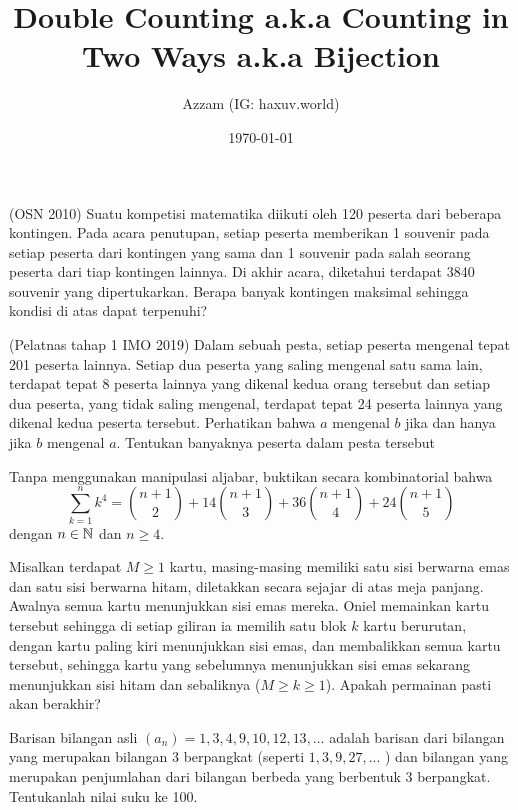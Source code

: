 \documentclass[11pt]{scrartcl}
\title{Double Counting a.k.a Counting in Two Ways a.k.a Bijection}
\author{Azzam (IG: haxuv.world)}
\date{\today}
\begin{document}
\maketitle

\begin{soaljawab}
    (OSN 2010) Suatu kompetisi matematika diikuti oleh 120 peserta dari beberapa kontingen. Pada acara penutupan, setiap peserta memberikan 1 souvenir pada setiap peserta dari kontingen yang sama dan 1 souvenir pada salah seorang peserta dari tiap kontingen lainnya. Di akhir acara, diketahui terdapat 3840 souvenir yang dipertukarkan. Berapa banyak kontingen maksimal sehingga kondisi di atas dapat terpenuhi?
\end{soaljawab}

\begin{soaljawab}
    (Pelatnas tahap 1 IMO 2019) Dalam sebuah pesta, setiap peserta mengenal tepat 201 peserta lainnya. Setiap dua peserta yang saling mengenal satu sama lain, terdapat tepat 8 peserta lainnya yang dikenal kedua orang tersebut dan setiap dua peserta, yang tidak saling mengenal, terdapat tepat 24 peserta lainnya yang dikenal kedua peserta tersebut. Perhatikan bahwa $a$ mengenal $b$ jika dan hanya jika $b$ mengenal $a$. Tentukan banyaknya peserta dalam pesta tersebut
\end{soaljawab}

\begin{soaljawab}
    Tanpa menggunakan manipulasi aljabar, buktikan secara kombinatorial bahwa
    $$\sum_{k=1}^{n} k^4 = {n+1 \choose 2} + 14{n+1 \choose 3}+36{n+1 \choose 4}+24{n+1 \choose 5}$$ dengan $n\in \mathbb N$ dan $n \ge 4$.
\end{soaljawab}

\begin{soaljawab}
Misalkan terdapat $M \ge 1$ kartu, masing-masing memiliki satu sisi berwarna emas dan satu sisi berwarna hitam, diletakkan secara sejajar di atas meja panjang. Awalnya semua kartu menunjukkan sisi emas mereka. Oniel memainkan kartu tersebut sehingga di setiap giliran ia memilih satu blok $k$ kartu berurutan, dengan kartu paling kiri menunjukkan sisi emas, dan membalikkan semua kartu tersebut, sehingga kartu yang sebelumnya menunjukkan sisi emas sekarang menunjukkan sisi hitam dan sebaliknya ($M \ge k \ge 1$). Apakah permainan pasti akan berakhir?
\end{soaljawab}

\begin{soaljawab}
Barisan bilangan asli $(a_n) = 1,3,4,9,10,12,13,\dots$ adalah barisan dari bilangan yang merupakan bilangan 3 berpangkat (seperti $1,3,9,27,...$ ) dan bilangan yang merupakan penjumlahan dari bilangan berbeda yang berbentuk 3 berpangkat. Tentukanlah nilai suku ke 100.
\end{soaljawab}
\end{document}
